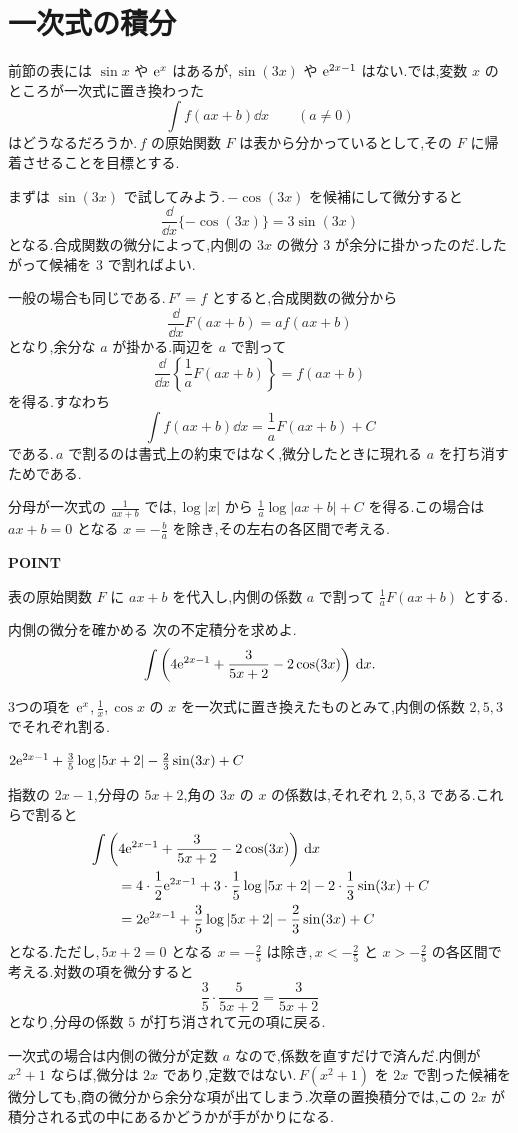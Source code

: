 \section{一次式の積分}\label{節:一次式の積分}

前節の表には $\sin x$ や $\mathrm{e}^x$ はあるが,\,$\sin(3x)$ や $\mathrm{e}^{2x-1}$ はない.では,変数 $x$ のところが一次式に置き換わった
\[
 \int f(ax+b)\dd x\qquad(a\ne0)
\]
はどうなるだろうか.\,$f$ の原始関数 $F$ は表から分かっているとして,その $F$ に帰着させることを目標とする.

まずは $\sin(3x)$ で試してみよう.\,$-\cos(3x)$ を候補にして微分すると
\[
 \frac{\dd}{\dd x}\{-\cos(3x)\}=3\sin(3x)
\]
となる.合成関数の微分によって,内側の $3x$ の微分 $3$ が余分に掛かったのだ.したがって候補を $3$ で割ればよい.

一般の場合も同じである.\,$F'=f$ とすると,合成関数の微分から
\[
 \frac{\dd}{\dd x}F(ax+b)=af(ax+b)
\]
となり,余分な $a$ が掛かる.両辺を $a$ で割って
\[
 \frac{\dd}{\dd x}\left\{\frac1aF(ax+b)\right\}=f(ax+b)
\]
を得る.すなわち
\[
 \int f(ax+b)\dd x=\frac1aF(ax+b)+C
\]
である.\,$a$ で割るのは書式上の約束ではなく,微分したときに現れる $a$ を打ち消すためである.

分母が一次式の $\frac1{ax+b}$ では,\,$\log|x|$ から $\frac1a\log|ax+b|+C$ を得る.この場合は $ax+b=0$ となる $x=-\frac ba$ を除き,その左右の各区間で考える.

\begin{bookpoint}
\textbf{POINT}\par
表の原始関数 $F$ に $ax+b$ を代入し,内側の係数 $a$ で割って $\frac1aF(ax+b)$ とする.
\end{bookpoint}

\begin{example}{内側の微分を確かめる}
次の不定積分を求めよ.
\[
 \int\left(4\mathrm{e}^{2x-1}+\frac3{5x+2}-2\cos(3x)\right)\,\mathrm{d} x.
\]
\end{example}

3つの項を $\mathrm{e}^x$,\,$\frac1x$,\,$\cos x$ の $x$ を一次式に置き換えたものとみて,内側の係数 $2,5,3$ でそれぞれ割る.

$2\mathrm{e}^{2x-1}+\frac35\log|5x+2|-\frac23\sin(3x)+C$

指数の $2x-1$,分母の $5x+2$,角の $3x$ の $x$ の係数は,それぞれ $2,5,3$ である.これらで割ると
\begin{align*}
 &\int\left(4\mathrm{e}^{2x-1}+\frac3{5x+2}-2\cos(3x)\right)\,\mathrm{d} x\\
 &\qquad=4\cdot\frac12\mathrm{e}^{2x-1}+3\cdot\frac15\log|5x+2|-2\cdot\frac13\sin(3x)+C\\
 &\qquad=2\mathrm{e}^{2x-1}+\frac35\log|5x+2|-\frac23\sin(3x)+C
\end{align*}
となる.ただし,\,$5x+2=0$ となる $x=-\frac25$ は除き,\,$x<-\frac25$ と $x>-\frac25$ の各区間で考える.対数の項を微分すると
\[
 \frac35\cdot\frac5{5x+2}=\frac3{5x+2}
\]
となり,分母の係数 $5$ が打ち消されて元の項に戻る.

一次式の場合は内側の微分が定数 $a$ なので,係数を直すだけで済んだ.内側が $x^2+1$ ならば,微分は $2x$ であり,定数ではない.\,$F(x^2+1)$ を $2x$ で割った候補を微分しても,商の微分から余分な項が出てしまう.次章の置換積分では,この $2x$ が積分される式の中にあるかどうかが手がかりになる.
